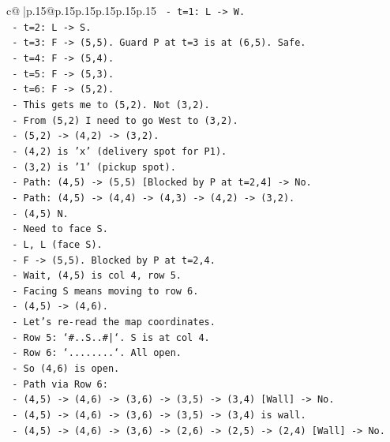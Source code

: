 \documentclass{article}
\begin{document}
{\begin{supertabular}{c@{$\;$}|p{.15\linewidth}@{}p{.15\linewidth}p{.15\linewidth}p{.15\linewidth}p{.15\linewidth}p{.15\linewidth}}
{{{\texttt{     {-} t=1: L {-}> W.} \\
\texttt{     {-} t=2: L {-}> S.} \\
\texttt{     {-} t=3: F {-}> (5,5). Guard P at t=3 is at (6,5). Safe.} \\
\texttt{     {-} t=4: F {-}> (5,4).} \\
\texttt{     {-} t=5: F {-}> (5,3).} \\
\texttt{     {-} t=6: F {-}> (5,2).} \\
\texttt{     {-} This gets me to (5,2). Not (3,2).} \\
\texttt{     {-} From (5,2) I need to go West to (3,2).} \\
\texttt{     {-} (5,2) {-}> (4,2) {-}> (3,2).} \\
\texttt{     {-} (4,2) is 'x' (delivery spot for P1).} \\
\texttt{     {-} (3,2) is '1' (pickup spot).} \\
\texttt{     {-} Path: (4,5) {-}> (5,5) {[}Blocked by P at t=2,4{]} {-}> No.} \\
\texttt{     {-} Path: (4,5) {-}> (4,4) {-}> (4,3) {-}> (4,2) {-}> (3,2).} \\
\texttt{       {-} (4,5) N.} \\
\texttt{       {-} Need to face S.} \\
\texttt{       {-} L, L (face S).} \\
\texttt{       {-} F {-}> (5,5). Blocked by P at t=2,4.} \\
\texttt{       {-} Wait, (4,5) is col 4, row 5.} \\
\texttt{       {-} Facing S means moving to row 6.} \\
\texttt{       {-} (4,5) {-}> (4,6).} \\
\texttt{       {-} Let's re{-}read the map coordinates.} \\
\texttt{       {-} Row 5: `\#..S..\#|`. S is at col 4.} \\
\texttt{       {-} Row 6: `........`. All open.} \\
\texttt{       {-} So (4,6) is open.} \\
\texttt{       {-} Path via Row 6:} \\
\texttt{         {-} (4,5) {-}> (4,6) {-}> (3,6) {-}> (3,5) {-}> (3,4) {[}Wall{]} {-}> No.} \\
\texttt{         {-} (4,5) {-}> (4,6) {-}> (3,6) {-}> (3,5) {-}> (3,4) is wall.} \\
\texttt{         {-} (4,5) {-}> (4,6) {-}> (3,6) {-}> (2,6) {-}> (2,5) {-}> (2,4) {[}Wall{]} {-}> No.} \\
}}}
\end{supertabular}}
\end{document}
